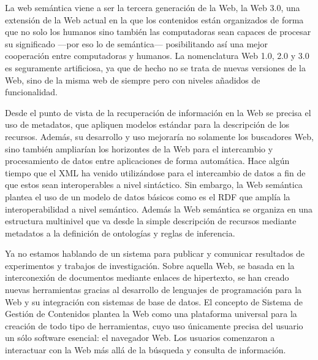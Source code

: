 La web semántica viene a ser la tercera generación de la Web, la Web 3.0, una extensión de la Web actual en la que los contenidos están organizados de forma que no solo los humanos sino también las computadoras sean capaces de procesar su significado —por eso lo de semántica— posibilitando así una mejor cooperación entre computadoras y humanos. La nomenclatura Web 1.0, 2.0 y 3.0 es seguramente artificiosa, ya que de hecho no se trata de nuevas versiones de la Web, sino de la misma web de siempre pero con niveles añadidos de funcionalidad. 




Desde el punto de vista de la recuperación de información en la Web se precisa el uso de metadatos, que apliquen modelos estándar para la descripción de los recursos. Además, su desarrollo y uso mejoraría no solamente los buscadores Web, sino también ampliarían los horizontes de la Web para el intercambio y procesamiento de datos entre aplicaciones de forma automática. Hace algún tiempo que el XML ha venido utilizándose para el intercambio de datos a fin de que estos sean interoperables a nivel sintáctico. Sin embargo, la Web semántica plantea el uso de un modelo de datos básicos como es el RDF que amplía la interoperabilidad a nivel semántico. Además la Web semántica se organiza en una estructura multinivel que va desde la simple descripción de recursos mediante metadatos a la definición de ontologías y reglas de inferencia.


Ya no estamos hablando de un sistema para publicar y comunicar resultados de experimentos y trabajos de investigación. Sobre aquella Web, se basada en la interconexión de documentos mediante enlaces de hipertexto, se han creado nuevas herramientas gracias al desarrollo de lenguajes de programación para la Web y su integración con sistemas de base de datos. El concepto de Sistema de Gestión de Contenidos plantea la Web como una plataforma universal para la creación de todo tipo de herramientas, cuyo uso únicamente precisa del usuario un sólo software esencial: el navegador Web. Los usuarios comenzaron a interactuar con la Web más allá de la búsqueda y consulta de información.




